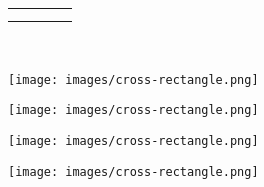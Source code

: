 \documentclass[10pt,]{article}
\theoremstyle{plain}
\theoremstyle{definition}
\theoremstyle{definition}
\theoremstyle{definition}
\theoremstyle{definition}
\theoremstyle{definition}
\theoremstyle{definition}
\numberwithin{equation}{section}
\newlength{\panelmax}
\begin{document}
{\begin{tabular}{@{}*{4}{c}@{}}
\begin{minipage}[c][\panelmax][b]{0.2\linewidth}\usebox{\panelboxCimage}\end{minipage}&
\begin{minipage}[c][\panelmax][c]{0.3\linewidth}\usebox{\panelboxDimage}\end{minipage}\tabularnewline
\parbox[t]{0.05\linewidth}{
}&
\parbox[t]{0.1\linewidth}{
}&
\parbox[t]{0.2\linewidth}{
}&
\parbox[t]{0.3\linewidth}{
}\end{tabular}\\
}%
{%
\setlength{\panelmax}{0pt}
\ifdefined\panelboxAimage\else\newsavebox{\panelboxAimage}\fi%
\begin{lrbox}{\panelboxAimage}
\texttt{[image: images/cross-rectangle.png]}
\end{lrbox}
\ifdefined\phAimage\else\newlength{\phAimage}\fi%
\setlength{\phAimage}{\ht\panelboxAimage+\dp\panelboxAimage}
\settototalheight{\phAimage}{\usebox{\panelboxAimage}}
\setlength{\panelmax}{\maxof{\panelmax}{\phAimage}}
\ifdefined\panelboxBimage\else\newsavebox{\panelboxBimage}\fi%
\begin{lrbox}{\panelboxBimage}
\texttt{[image: images/cross-rectangle.png]}
\end{lrbox}
\ifdefined\phBimage\else\newlength{\phBimage}\fi%
\setlength{\phBimage}{\ht\panelboxBimage+\dp\panelboxBimage}
\settototalheight{\phBimage}{\usebox{\panelboxBimage}}
\setlength{\panelmax}{\maxof{\panelmax}{\phBimage}}
\ifdefined\panelboxCimage\else\newsavebox{\panelboxCimage}\fi%
\begin{lrbox}{\panelboxCimage}
\texttt{[image: images/cross-rectangle.png]}
\end{lrbox}
\ifdefined\phCimage\else\newlength{\phCimage}\fi%
\setlength{\phCimage}{\ht\panelboxCimage+\dp\panelboxCimage}
\settototalheight{\phCimage}{\usebox{\panelboxCimage}}
\setlength{\panelmax}{\maxof{\panelmax}{\phCimage}}
\ifdefined\panelboxDimage\else\newsavebox{\panelboxDimage}\fi%
\begin{lrbox}{\panelboxDimage}
\texttt{[image: images/cross-rectangle.png]}
\end{lrbox}
}
\end{document}
